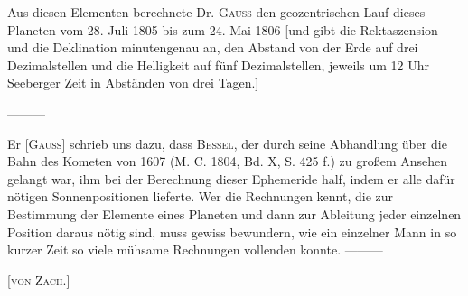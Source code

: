 \indent Aus diesen Elementen berechnete Dr. \textsc{Gauss} den geozentrischen Lauf dieses Planeten vom 28. Juli 1805 bis zum 24. Mai 1806 [und gibt die Rektaszension und die Deklination minutengenau an, den Abstand von der Erde auf drei Dezimalstellen und die Helligkeit auf fünf Dezimalstellen, jeweils um 12 Uhr Seeberger Zeit in Abständen von drei Tagen.]

—\quad—\quad—

Er [\textsc{Gauss}] schrieb uns dazu, dass \textsc{Bessel}, der durch seine Abhandlung über die Bahn des Kometen von 1607 (M. C. 1804, Bd. X, S. 425 f.) zu großem Ansehen gelangt war, ihm bei der Berechnung dieser Ephemeride half, indem er alle dafür nötigen Sonnenpositionen lieferte. Wer die Rechnungen kennt, die zur Bestimmung der Elemente eines Planeten und dann zur Ableitung jeder einzelnen Position daraus nötig sind, muss gewiss bewundern, wie ein einzelner Mann in so kurzer Zeit so viele mühsame Rechnungen vollenden konnte. —\quad—\quad—

\hfill[\textsc{von Zach.}]
